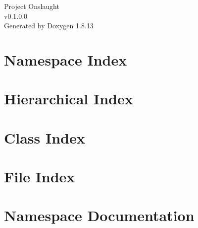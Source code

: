 \documentclass[twoside]{book}
\newcommand{\+}{\discretionary{\mbox{\scriptsize$\hookleftarrow$}}{}{}}
\newcommand{\clearemptydoublepage}{%
  \newpage{\pagestyle{empty}\cleardoublepage}%
}
\begin{document}
\hypersetup{pageanchor=false,
             bookmarksnumbered=true,
             pdfencoding=unicode
            }
\begin{titlepage}
\vspace*{7cm}
\begin{center}%
{\Large Project Onslaught \\[1ex]\large v0.\+1.\+0.\+0 }\\
\vspace*{1cm}
{\large Generated by Doxygen 1.8.13}\\
\end{center}
\end{titlepage}
\clearemptydoublepage
{}
\tableofcontents
\clearemptydoublepage
{}
\hypersetup{pageanchor=true}

\chapter{Namespace Index}

\chapter{Hierarchical Index}

\chapter{Class Index}

\chapter{File Index}

\chapter{Namespace Documentation}




\end{document}
